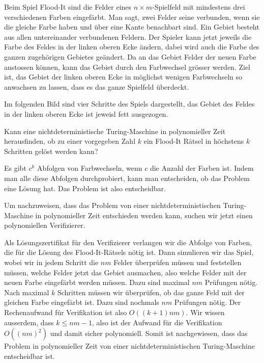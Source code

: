 Beim Spiel Flood-It sind die Felder eines $n\times m$-Spielfeld mit 
mindestens drei verschiedenen Farben eingefärbt.
Man sagt, zwei Felder seine verbunden, wenn sie die gleiche Farbe
haben und über eine Kante benachbart sind.
Ein Gebiet besteht aus allen untereinander verbundenen Feldern.
Der Spieler kann jetzt jeweils die Farbe des Feldes in der linken
oberen Ecke ändern, dabei wird auch die Farbe des ganzen zugehörigen
Gebietes geändert.
Da an das Gebiet Felder der neuen Farbe anstossen können, kann das
Gebiet durch den Farbwechsel grösser werden.
Ziel ist, das Gebiet der linken oberen Ecke in möglichst wenigen
Farbwechseln so anwachsen zu lassen, dass es das ganze Spielfeld überdeckt.

Im folgenden Bild sind vier Schritte des Spiels dargestellt, das Gebiet
des Feldes in der linken oberen Ecke ist jeweisl fett ausgezogen.
\begin{center}
\end{center}
Kann eine nichtdeterministische Turing-Maschine in polynomieller Zeit 
herausfinden, ob zu einer vorgegeben Zahl $k$ ein Flood-It
Rätsel in höchstens $k$ Schritten gelöst werden kann?


\begin{loesung}
Es gibt $c^k$ Abfolgen von Farbwechseln, wenn $c$ die Anzahl der Farben ist.
Indem man alle diese Abfolgen durchprobiert, kann man entscheiden, ob
das Problem eine Lösung hat.
Das Problem ist also entscheidbar.

Um nachzuweisen, dass das Problem von einer nichtdeterministischen
Turing-Maschine in polynomieller Zeit entschieden werden kann,
suchen wir jetzt einen polynomiellen Verifizierer.

Als Lösungszertifikat für den Verifizierer verlangen wir die Abfolge
von Farben, die für die Lösung des Flood-It-Rätsels nötig ist.
Dann simulieren wir das Spiel, wobei wir in jedem Schritt
die $nm$ Felder überprüfen müssen und feststellen müssen, welche
Felder jetzt das Gebiet ausmachen, also welche Felder mit der neuen
Farbe eingefärbt werden müssen.
Dazu sind maximal $nm$ Prüfungen nötig.
Nach maximal $k$ Schritten müssen wir überprüfen, ob das ganze Feld
mit der gleichen Farbe eingefärbt ist.
Dazu sind nochmals $nm$ Prüfungen nötig.
Der Rechenaufwand für Verifikation ist also $O((k+1)nm)$.
Wir wissen ausserdem, dass $k\le nm-1$, also ist der Aufwand für die
Verifikation $O((nm)^2)$ und damit sicher polynomiell.
Somit ist nachgewiesen, dass das Problem in polynomieller Zeit von
einer nichtdeterministischen Turing-Maschine entscheidbar ist.
\end{loesung}


